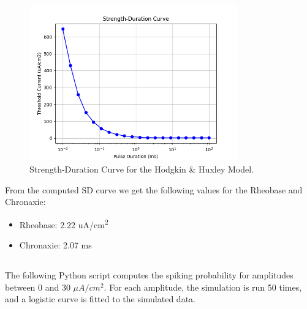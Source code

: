 \documentclass{article}
\begin{document}
    \begin{figure}[h]
        \centering
        \includegraphics[width=0.8\textwidth]{sd_curve.png}
        \caption{Strength-Duration Curve for the Hodgkin \& Huxley Model.}
        \label{fig:sd_curve_plot}
    \end{figure}

    From the computed SD curve we get the following values for the Rheobase and Chronaxie:

    \begin{itemize}
        \item Rheobase: 2.22 uA/cm\textsuperscript{2}
        \item Chronaxie: 2.07 ms
    \end{itemize}

    \subsection{}


    The following Python script computes the spiking probability for amplitudes between 0 and 30 $\mu A/cm^2$.
    For each amplitude, the simulation is run 50 times, and a logistic curve is fitted to the simulated data.
\end{document}
